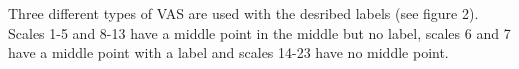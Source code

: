 \documentclass[paperwidth=160cm,paperheight=100cm,landscape,fontscale=0.3010]{baposter}
\begin{document}
\begin{poster}
{%
Three different types of VAS are used with the desribed labels (see figure 2). Scales 1-5 and 8-13 have a middle point in the middle but no label, scales 6 and 7 have a middle point with a label and scales 14-23 have no middle point.
\begin{center}

\end{center}}
\end{poster}
\end{document}
